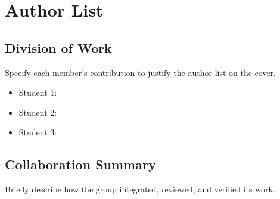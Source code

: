 \section{Author List}

\subsection{Division of Work}

Specify each member's contribution to justify the author list on the cover.

\begin{itemize}[leftmargin=2em]
  \item Student 1:
  \item Student 2:
  \item Student 3:
\end{itemize}

\subsection{Collaboration Summary}

Briefly describe how the group integrated, reviewed, and verified its work.
